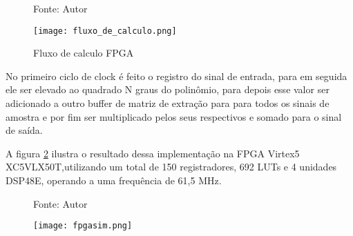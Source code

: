 \begin{figure}[ht!]
	\centering
	\captionsetup{justification=centering}
	\caption*{Fonte: Autor}
	\texttt{[image: fluxo\_de\_calculo.png]}
	\caption{Fluxo de calculo FPGA}
	\label{fig:fluxocal}
\end{figure}

No primeiro ciclo de clock é feito o registro do sinal de entrada, para em seguida ele ser elevado ao quadrado N graus do polinômio, para depois esse valor ser adicionado a outro buffer de matriz de extração para para todos os sinais de amostra e por fim ser multiplicado pelos seus respectivos e somado para o sinal de saída.

A figura \ref{fig:simfpga} ilustra o resultado dessa implementação na  FPGA Virtex5 XC5VLX50T,utilizando um total de 150 registradores, 692 LUTs e 4 unidades DSP48E, operando a uma frequência de 61,5 MHz.
\begin{figure}[ht!]
	\centering
	\captionsetup{justification=centering}
	\caption*{Fonte: Autor}
	\texttt{[image: fpgasim.png]}
	\caption{}
	\label{fig:simfpga}
\end{figure}

